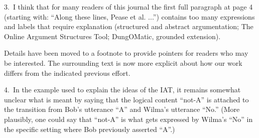 

\begin{mdframed}[backgroundcolor=orange!10]
3.~I think that for many readers of this journal the first full paragraph at page 4 (starting with: ``Along these lines, Pease et al. ...'') contains too many expressions and labels that require explanation (structured and abstract argumentation; The Online Argument Structures Tool; DungOMatic, grounded extension). 
\end{mdframed}

Details have been moved to a footnote to provide pointers for readers who
may be interested.  The surrounding text is now more explicit about
how our work differs from the indicated previous effort.




\begin{mdframed}[backgroundcolor=orange!10]
4.~In the example used to explain the ideas of the IAT, it remains somewhat unclear what is meant by saying that the logical content ``not-A'' is attached to the transition from Bob's utterance ``A'' and Wilma's utterance ``No.'' (More plausibly, one could say that ``not-A'' is what gets expressed by Wilma's ``No'' in the specific setting where Bob previously asserted ``A''.)
\end{mdframed}

